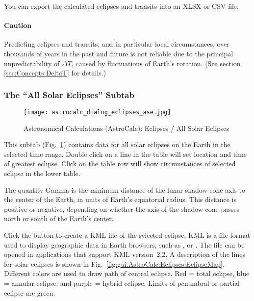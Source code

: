 You can export the calculated eclipses and transits into an XLSX or CSV file.

\paragraph{Caution}
Predicting eclipses and transits, and in particular local circumstances, over thousands of years in the past and future
is not reliable due to the principal unpredictability of $\Delta T$, caused by fluctuations of Earth's rotation. (See section \ref{sec:Concepts:DeltaT} for details.)


\subsubsection{The ``All Solar Eclipses'' Subtab}
\label{sec:gui:AstroCalc:Eclipses:AllSolarEclipses}


\begin{figure}[hb]
\centering\texttt{[image: astrocalc\_dialog\_eclipses\_ase.jpg]}
\caption{Astronomical Calculations (AstroCalc): Eclipses / All Solar Eclipses}
\label{fig:gui:AstroCalc:Eclipses:AllSolarEclipses}
\end{figure}

\noindent This subtab (Fig.~\ref{fig:gui:AstroCalc:Eclipses:AllSolarEclipses}) contains data for all solar eclipses on the Earth in the selected time range. 
Double click on a line in the table will set location and time of greatest eclipse. Click on the table row will show circumstances of selected eclipse in the lower table.

The quantity Gamma is the minimum distance of the lunar shadow cone axis to the center of the Earth, in units of Earth’s equatorial radius.
This distance is positive or negative, depending on whether the axis of the shadow cone passes north or south of the Earth's center.

Click the  button to create a KML file of the
selected eclipse. KML is a file format used to display geographic data
in Earth browsers, such as ,  or
. The file can be opened in applications that
support KML version~2.2. A description of the lines for solar eclipses
is shown in Fig.~\ref{fig:gui:AstroCalc:Eclipses:EclipseMap}.
Different colors are used to draw path of central eclipse. Red = total
eclipse, blue = annular eclipse, and purple = hybrid eclipse. Limits
of penumbral or partial eclipse are green.

